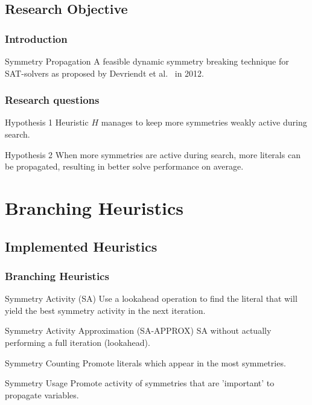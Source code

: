 \documentclass{beamer}
\begin{document}
	\subsection{Research Objective}
	\begin{frame}
		\frametitle{Introduction}
		\begin{block}{Symmetry Propagation}
			A feasible dynamic symmetry breaking technique for SAT-solvers as proposed by Devriendt et al.~\cite{devriendt2012symmetry} in 2012.
		\end{block}
	\end{frame}

	\begin{frame}
		\frametitle{Research questions}
		\begin{block}{Hypothesis 1}
			\label{hyp:increased_activity}
			Heuristic $H$ manages to keep more symmetries weakly active during search.
		\end{block}
		
		\begin{block}{Hypothesis 2}
			\label{hyp:activity_equals_speed}
			When more symmetries are active during search, more literals can be propagated, resulting in
			better solve performance on average.
		\end{block}
	\end{frame}

\section{Branching Heuristics}

	\subsection{Implemented Heuristics}
	\begin{frame}%
		\frametitle{Branching Heuristics}

		\begin{block}{Symmetry Activity (SA)}
			Use a lookahead operation to find the literal that will yield the best symmetry activity
			in the next iteration.
		\end{block}

		\begin{block}{Symmetry Activity Approximation (SA-APPROX)}
			SA without actually performing a full iteration (lookahead).
		\end{block}

		\begin{block}{Symmetry Counting}
			Promote literals which appear in the most symmetries.
		\end{block}

		\begin{block}{Symmetry Usage}
			Promote activity of symmetries that are
			'important' to propagate variables.
		\end{block}
	\end{frame}
\end{document}
